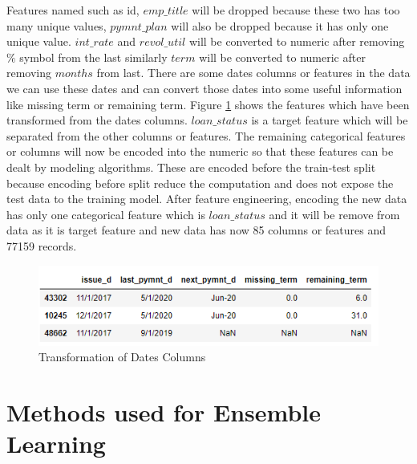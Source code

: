 \documentclass[12pt]{article}
\begin{document}
 Features named such as id, $emp\_title$ will be dropped because these two has too many unique values, $pymnt\_plan$ will also be dropped because it has only one unique value. $int\_rate$ and $revol\_util$ will be converted to numeric after removing $\%$ symbol from the last similarly $term$ will be converted to numeric after removing $months$ from last. There are some dates columns or features in the data we can use these dates and can convert those dates into some useful information like missing term or remaining term. Figure \ref{fig:dates} shows the features which have been transformed from the dates columns. $loan\_status$ is a target feature which will be separated from the other columns or features. The remaining categorical features or columns will now be encoded into the numeric so that these features can be dealt by modeling algorithms. These are encoded before the train-test split because encoding before split reduce the computation and does not expose the test data to the training model. After feature engineering, encoding the new data has only one categorical feature which is $loan\_status$ and it will be remove from data as it is target feature and new data has now 85 columns or features and 77159 records.

\begin{figure}[h!]
	\centering
	\includegraphics{dates.png}
	\caption{Transformation of Dates Columns}
	\label{fig:dates}
\end{figure}

\section{Methods used for Ensemble Learning}
\end{document}
